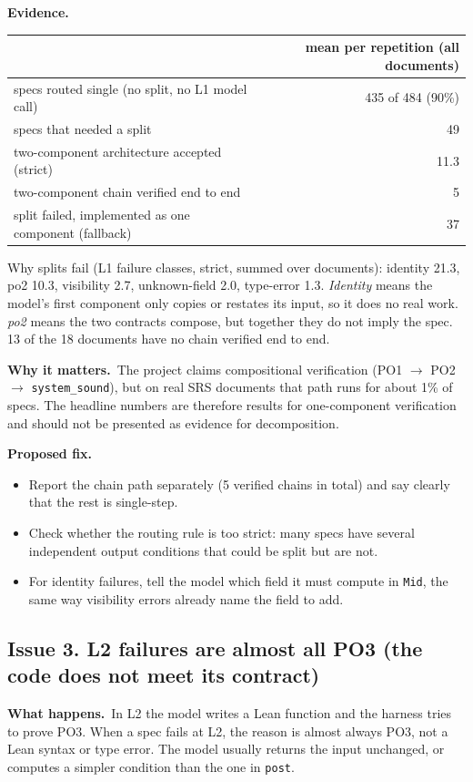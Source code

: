 \documentclass[10pt,a4paper]{article}
\newcommand{\code}[1]{\texttt{\small #1}}
\newcommand{\what}{\par\smallskip\textbf{What happens.}~}
\newcommand{\evidence}{\par\smallskip\textbf{Evidence.}~}
\newcommand{\why}{\par\smallskip\textbf{Why it matters.}~}
\newcommand{\fix}{\par\smallskip\textbf{Proposed fix.}~}
\begin{document}
\evidence
\begin{center}
\begin{tabular}{@{}lr@{}}
\toprule
 & mean per repetition (all documents) \\
\midrule
specs routed single (no split, no L1 model call)         & 435 of 484 (90\%) \\
specs that needed a split                                 & 49 \\
two-component architecture accepted (strict)              & 11.3 \\
two-component chain verified end to end                   & 5 \\
split failed, implemented as one component (fallback)     & 37 \\
\bottomrule
\end{tabular}
\end{center}
Why splits fail (L1 failure classes, strict, summed over documents): identity 21.3, po2 10.3, visibility 2.7,
unknown-field 2.0, type-error 1.3. \emph{Identity} means the model's first component only copies or restates its input,
so it does no real work. \emph{po2} means the two contracts compose, but together they do not imply the spec.
13 of the 18 documents have no chain verified end to end.

\why The project claims compositional verification (PO1 $\rightarrow$ PO2 $\rightarrow$ \code{system\_sound}), but on real
SRS documents that path runs for about 1\% of specs. The headline numbers are therefore results for one-component
verification and should not be presented as evidence for decomposition.

\fix
\begin{itemize}
\item Report the chain path separately (5 verified chains in total) and say clearly that the rest is single-step.
\item Check whether the routing rule is too strict: many specs have several independent output conditions that could be
      split but are not.
\item For identity failures, tell the model which field it must compute in \code{Mid}, the same way visibility errors
      already name the field to add.
\end{itemize}

\subsection*{Issue 3. L2 failures are almost all PO3 (the code does not meet its contract)}
\what In L2 the model writes a Lean function and the harness tries to prove PO3. When a spec fails at L2, the reason is almost
always PO3, not a Lean syntax or type error. The model usually returns the input unchanged, or computes a simpler condition
than the one in \code{post}.
\end{document}
